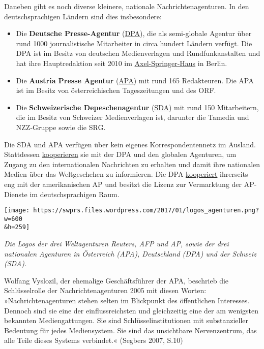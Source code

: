 Daneben gibt es noch diverse kleinere, nationale Nachrichtenagenturen.
In den deutsch­sprachigen Ländern sind dies insbesondere:

\begin{itemize}
\tightlist
\item
  Die \textbf{Deutsche Presse-Agentur}
  (\href{https://de.wikipedia.org/wiki/Deutsche_Presse-Agentur}{DPA}),
  die als semi-globale Agentur über rund 1000 journalistische
  Mitarbeiter in circa hundert Ländern verfügt. Die DPA ist im Besitz
  von deutschen Medienverlagen und Rundfunkanstalten und hat ihre
  Hauptredaktion seit 2010 im
  \href{http://www.spiegel.de/kultur/gesellschaft/konflikt-um-springer-naehe-tagesspiegel-kuendigt-der-dpa-a-659850.html}{Axel-Springer-Haus}
  in Berlin.
\item
  Die \textbf{Austria Presse Agentur}
  (\href{https://de.wikipedia.org/wiki/Austria_Presse_Agentur}{APA}) mit
  rund 165 Redakteuren. Die APA ist im Besitz von österreichischen
  Tageszeitungen und des ORF.
\item
  Die \textbf{Schweizerische Depeschenagentur}
  (\href{https://de.wikipedia.org/wiki/Schweizerische_Depeschenagentur}{SDA})
  mit rund 150 Mitarbeitern, die im Besitz von Schweizer Medien­verlagen
  ist, darunter die Tamedia und NZZ-Gruppe sowie die SRG.
\end{itemize}

Die SDA und APA verfügen über kein eigenes Korrespondentennetz im
Ausland. Stattdessen
\href{https://web.archive.org/web/20170425121815/http://www.sda.ch/de/dienste/unternehmen-ohne-verlag/internationale-kooperationen}{kooperieren}
sie mit der DPA und den globalen Agenturen, um Zugang zu den
internationalen Nachrichten zu erhalten und damit ihre nationalen Medien
über das Weltgeschehen zu informieren. Die DPA
\href{https://www.presseportal.de/pm/8218/2363699}{kooperiert}
ihrerseits eng mit der amerikanischen AP und besitzt die Lizenz zur
Vermarktung der AP-Dienste im deutsch­sprachigen Raum.

\texttt{[image: https://swprs.files.wordpress.com/2017/01/logos\_agenturen.png?w=600\\\&h=259]}

\emph{Die Logos der drei Weltagenturen Reuters, AFP und AP, sowie der
drei nationalen Agenturen in Österreich (APA), Deutschland (DPA) und der
Schweiz (SDA).}

Wolfang Vyslozil, der ehemalige Geschäftsführer der APA, beschrieb die
Schlüsselrolle der Nachrichtenagenturen 2005 mit diesen Worten:
»Nachrichtenagenturen stehen selten im Blickpunkt des öffentlichen
Interesses. Dennoch sind sie eine der einflussreichsten und gleichzeitig
eine der am wenigsten bekannten Mediengattungen. Sie sind
Schlüssel­institutionen mit substanzieller Bedeutung für jedes
Mediensystem. Sie sind das unsichtbare Nervenzentrum, das alle Teile
dieses Systems verbindet.« (Segbers 2007, S.10)

